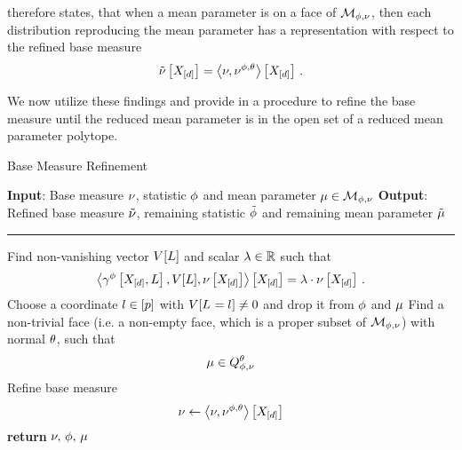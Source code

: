  therefore states, that when a mean parameter is on a face of $\mathcal{M}_{\phi,\nu}$, then each distribution reproducing the mean parameter has a representation with respect to the refined base measure
\begin{align*}
	\tilde{\nu}\left[X_{[d]}\right] = \left\langle \nu,\nu^{\phi,\theta}\right\rangle \left[ X_{[d]} \right] \, . 
\end{align*}

We now utilize these findings and provide in  a procedure to refine the base measure until the reduced mean parameter is in the open set of a reduced mean parameter polytope.

\begin{algorithm}[h!]
\caption{Base Measure Refinement}\label{alg:baseMeasureRefinement}
\begin{algorithmic}
\State \textbf{Input}: Base measure $\nu$, statistic $\phi$ and mean parameter $\mu\in\mathcal{M}_{\phi,\nu}$
\State \textbf{Output}: Refined base measure $\tilde{\nu}$, remaining statistic $\tilde{\phi}$ and remaining mean parameter $\tilde{\mu}$
\hrule
\While{$\meanparam\notin\sbinteriorof{\genmeanset}$}
		\State Find non-vanishing vector $V[L]$ and scalar $\lambda\in\mathbb{R}$ such that 
			\[ \left\langle \gamma^{\phi}\left[X_{[d]},L\right],V[L],\nu\left[X_{[d]}\right]\right\rangle \left[ X_{[d]} \right] = \lambda\cdot\nu\left[X_{[d]}\right] \, . \]
		\State Choose a coordinate $l\in[p]$ with $V[L_{}=l_{}]\neq0$ and drop it from $\phi$ and $\mu$
	\EndWhile
	\State Find a non-trivial face (i.e. a non-empty face, which is a proper subset of $\mathcal{M}_{\phi,\nu}$) with normal $\theta$, such that
		\[ \mu\in Q^{\theta}_{\phi,\nu} \]
	\State Refine base measure
		\[ \nu \leftarrow \left\langle \nu,\nu^{\phi,\theta}\right\rangle \left[ X_{[d]} \right] \]
\EndWhile
\State \textbf{return} $\nu, \, \phi,\,\mu$
\end{algorithmic}
\end{algorithm}

